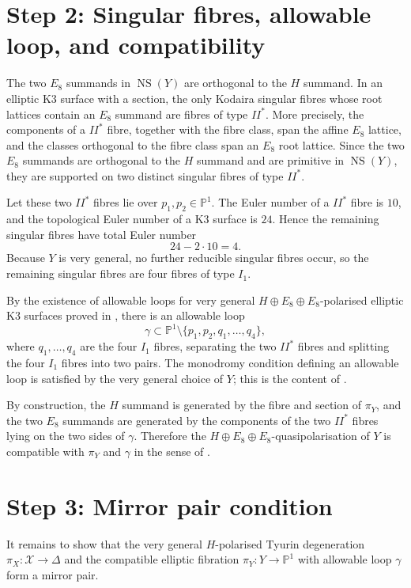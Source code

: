 \documentclass{article}
\theoremstyle{plain}
\begin{document}
\section*{Step 2: Singular fibres, allowable loop, and compatibility}

The two $E_8$ summands in $\operatorname{NS}(Y)$ are orthogonal to the $H$ summand. In an elliptic K3 surface with a section, the only Kodaira singular fibres whose root lattices contain an $E_8$ summand are fibres of type $II^*$. More precisely, the components of a $II^*$ fibre, together with the fibre class, span the affine $E_8$ lattice, and the classes orthogonal to the fibre class span an $E_8$ root lattice. Since the two $E_8$ summands are orthogonal to the $H$ summand and are primitive in $\operatorname{NS}(Y)$, they are supported on two distinct singular fibres of type $II^*$.

Let these two $II^*$ fibres lie over $p_1,p_2\in \mathbb P^1$. The Euler number of a $II^*$ fibre is $10$, and the topological Euler number of a K3 surface is $24$. Hence the remaining singular fibres have total Euler number
\[
24-2\cdot 10=4.
\]
Because $Y$ is very general, no further reducible singular fibres occur, so the remaining singular fibres are four fibres of type $I_1$.

By the existence of allowable loops for very general $H\oplus E_8\oplus E_8$-polarised elliptic K3 surfaces proved in \cite[Section 4]{dfk3slpms}, there is an allowable loop
\[
\gamma\subset \mathbb P^1\setminus\{p_1,p_2,q_1,\dots,q_4\},
\]
where $q_1,\dots,q_4$ are the four $I_1$ fibres, separating the two $II^*$ fibres and splitting the four $I_1$ fibres into two pairs. The monodromy condition defining an allowable loop is satisfied by the very general choice of $Y$; this is the content of \cite[Lemma 4.14]{dfk3slpms}.

By construction, the $H$ summand is generated by the fibre and section of $\pi_Y$, and the two $E_8$ summands are generated by the components of the two $II^*$ fibres lying on the two sides of $\gamma$. Therefore the $H\oplus E_8\oplus E_8$-quasipolarisation of $Y$ is compatible with $\pi_Y$ and $\gamma$ in the sense of \cite[Definition 4.21]{dfk3slpms}.

\section*{Step 3: Mirror pair condition}

It remains to show that the very general $H$-polarised Tyurin degeneration $\pi_X\colon \mathcal X\to \Delta$ and the compatible elliptic fibration $\pi_Y\colon Y\to \mathbb P^1$ with allowable loop $\gamma$ form a mirror pair.
\end{document}
